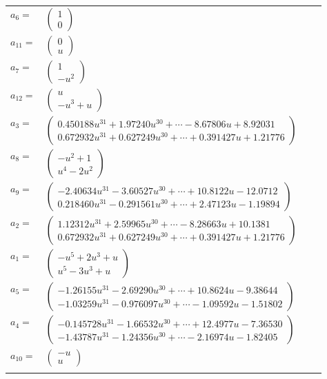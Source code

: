 \documentclass[1p]{elsarticle_modified}
\theoremstyle{definition}
\begin{document}
\begin{tabular}{m{7pt} m{180pt} m{7pt} m{180pt} }
\flushright $a_{6}=$&$\begin{pmatrix}1\\0\end{pmatrix}$ \\
\flushright $a_{11}=$&$\begin{pmatrix}0\\u\end{pmatrix}$ \\
\flushright $a_{7}=$&$\begin{pmatrix}1\\- u^2\end{pmatrix}$ \\
\flushright $a_{12}=$&$\begin{pmatrix}u\\- u^3+u\end{pmatrix}$ \\
\flushright $a_{3}=$&$\begin{pmatrix}0.450188 u^{31}+1.97240 u^{30}+\cdots-8.67806 u+8.92031\\0.672932 u^{31}+0.627249 u^{30}+\cdots+0.391427 u+1.21776\end{pmatrix}$ \\
\flushright $a_{8}=$&$\begin{pmatrix}- u^2+1\\u^4-2 u^2\end{pmatrix}$ \\
\flushright $a_{9}=$&$\begin{pmatrix}-2.40634 u^{31}-3.60527 u^{30}+\cdots+10.8122 u-12.0712\\0.218460 u^{31}-0.291561 u^{30}+\cdots+2.47123 u-1.19894\end{pmatrix}$ \\
\flushright $a_{2}=$&$\begin{pmatrix}1.12312 u^{31}+2.59965 u^{30}+\cdots-8.28663 u+10.1381\\0.672932 u^{31}+0.627249 u^{30}+\cdots+0.391427 u+1.21776\end{pmatrix}$ \\
\flushright $a_{1}=$&$\begin{pmatrix}- u^5+2 u^3+u\\u^5-3 u^3+u\end{pmatrix}$ \\
\flushright $a_{5}=$&$\begin{pmatrix}-1.26155 u^{31}-2.69290 u^{30}+\cdots+10.8624 u-9.38644\\-1.03259 u^{31}-0.976097 u^{30}+\cdots-1.09592 u-1.51802\end{pmatrix}$ \\
\flushright $a_{4}=$&$\begin{pmatrix}-0.145728 u^{31}-1.66532 u^{30}+\cdots+12.4977 u-7.36530\\-1.43787 u^{31}-1.24356 u^{30}+\cdots-2.16974 u-1.82405\end{pmatrix}$ \\
\flushright $a_{10}=$&$\begin{pmatrix}- u\\u\end{pmatrix}$\\&\end{tabular}
\end{document}
